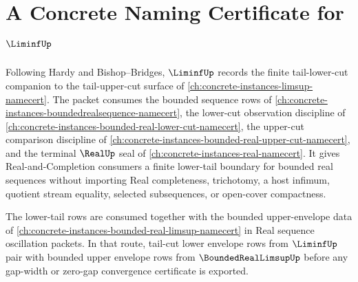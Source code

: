 \chapter{A Concrete Naming Certificate for $\LiminfUp$}
\label{ch:concrete-instances-liminf-namecert}

Following Hardy and Bishop--Bridges, $\LiminfUp$ records the finite tail-lower-cut companion to the tail-upper-cut surface of \autoref{ch:concrete-instances-limsup-namecert}. The packet consumes the bounded sequence rows of \autoref{ch:concrete-instances-boundedrealsequence-namecert}, the lower-cut observation discipline of \autoref{ch:concrete-instances-bounded-real-lower-cut-namecert}, the upper-cut comparison discipline of \autoref{ch:concrete-instances-bounded-real-upper-cut-namecert}, and the terminal $\RealUp$ seal of \autoref{ch:concrete-instances-real-namecert}. It gives Real-and-Completion consumers a finite lower-tail boundary for bounded real sequences without importing Real completeness, trichotomy, a host infimum, quotient stream equality, selected subsequences, or open-cover compactness.

The lower-tail rows are consumed together with the bounded upper-envelope data of \autoref{ch:concrete-instances-bounded-real-limsup-namecert} in Real sequence oscillation packets. In that route, tail-cut lower envelope rows from $\LiminfUp$ pair with bounded upper envelope rows from $\BoundedRealLimsupUp$ before any gap-width or zero-gap convergence certificate is exported.

